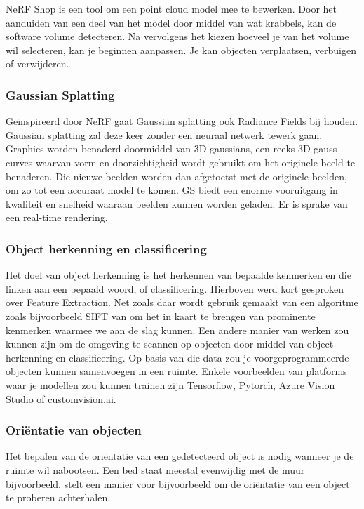 NeRF Shop is een tool om een point cloud model mee te bewerken. Door het aanduiden van een deel van het model door middel van wat krabbels, kan de software volume detecteren. Na vervolgens het kiezen hoeveel je van het volume wil selecteren, kan je beginnen aanpassen.
Je kan objecten verplaatsen, verbuigen of verwijderen.\autocite{NeRFshop23}

\subsubsection{Gaussian Splatting}

Geïnspireerd door NeRF gaat Gaussian splatting ook Radiance Fields bij houden. Gaussian splatting zal deze keer zonder een neuraal netwerk tewerk gaan. Graphics worden benaderd doormiddel van 3D gaussians, een reeks 3D gauss curves waarvan vorm en doorzichtigheid wordt gebruikt om het originele beeld te benaderen. Die nieuwe beelden worden dan afgetoetst met de originele beelden, om zo tot een accuraat model te komen.
GS biedt een enorme vooruitgang in kwaliteit en snelheid waaraan beelden kunnen worden geladen. Er is sprake van een real-time rendering. \autocite{Kerbl2023}


\subsubsection{Object herkenning en classificering}

Het doel van object herkenning is het herkennen van bepaalde kenmerken en die linken aan een bepaald woord, of classificering. Hierboven werd kort gesproken over Feature Extraction. Net zoals daar wordt gebruik gemaakt van een algoritme zoals bijvoorbeeld SIFT van \textcite{Schonberger2016} om het in kaart te brengen van prominente kenmerken waarmee we aan de slag kunnen.
Een andere manier van werken zou kunnen zijn om de omgeving te scannen op objecten door middel van object herkenning en classificering. Op basis van die data zou je voorgeprogrammeerde objecten kunnen samenvoegen in een ruimte.
Enkele voorbeelden van platforms waar je modellen zou kunnen trainen zijn Tensorflow, Pytorch, Azure Vision Studio of customvision.ai.

\subsubsection{Oriëntatie van objecten}

Het bepalen van de oriëntatie van een gedetecteerd object is nodig wanneer je de ruimte wil nabootsen. Een bed staat meestal evenwijdig met de muur bijvoorbeeld. \textcite{Saxena2009} stelt een manier voor bijvoorbeeld om de oriëntatie van een object te proberen achterhalen.

